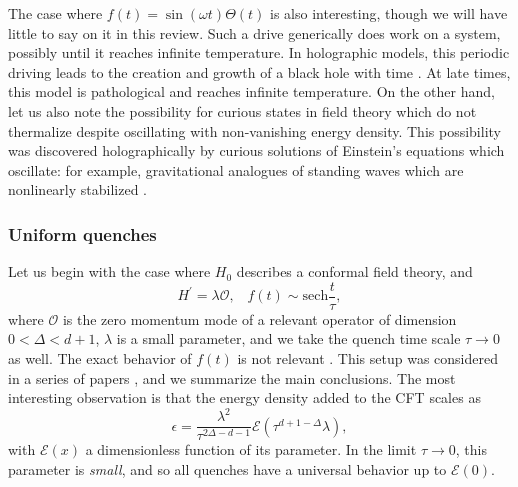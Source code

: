\documentclass[10pt, oneside]{book}
\begin{document}
\begin{doublespace}
The case where $f(t)=\sin(\omega t)\Theta(t)$ is also interesting, though we will have little to say on it in this review.   Such a drive generically does work on a system, possibly until it reaches infinite temperature.  In holographic models, this periodic driving leads to the creation and growth of a black hole with time \cite{Auzzi:2013pca}.   At late times, this model is pathological and reaches infinite temperature.    On the other hand, let us also note the possibility for curious states in field theory which do not thermalize despite oscillating with non-vanishing energy density.   This possibility was discovered holographically by curious solutions of Einstein's equations which oscillate:  for example, gravitational analogues of standing waves which are nonlinearly stabilized \cite{Dias:2012tq, Buchel:2013uba}.

\subsubsection{Uniform quenches}
Let us begin with the case where $H_0$ describes a conformal field theory, and \begin{equation}
H^\prime = \lambda \mathcal{O}, \;\;\; f(t) \sim \mathrm{sech}\frac{t}{\tau},
\end{equation}
where $\mathcal{O}$ is the zero momentum mode of a relevant operator of dimension $0<\Delta<d+1$, $\lambda$ is a small parameter, and we take the quench time scale $\tau\rightarrow 0$ as well.    The exact behavior of $f(t)$ is not relevant .    This setup was considered in a series of papers \cite{Bhattacharyya:2009uu, Buchel:2013gba, Das:2014jna, Das:2014hqa}, and we summarize the main conclusions.    The most interesting observation is that the energy density added to the CFT scales as \begin{equation}
\epsilon = \frac{\lambda^2}{\tau^{2\Delta-d-1}} \mathcal{E}\left(\tau^{d+1-\Delta} \lambda\right),   \label{721eq}
\end{equation}with $\mathcal{E}(x)$ a dimensionless function of its parameter.   In the limit $\tau \rightarrow 0$,  this parameter is \emph{small}, and so all quenches have a universal behavior up to $\mathcal{E}(0)$.


\end{doublespace}
\end{document}
